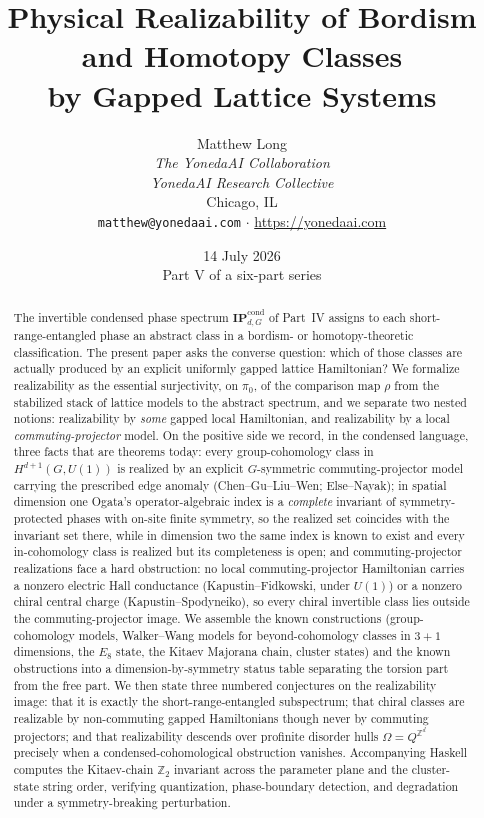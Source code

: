 \documentclass[12pt]{article}
\title{\bfseries Physical Realizability of Bordism and Homotopy Classes\\ by Gapped Lattice Systems}
\author{Matthew Long \\
\textit{The YonedaAI Collaboration} \\
\textit{YonedaAI Research Collective} \\
Chicago, IL \\
\texttt{matthew@yonedaai.com} $\cdot$ \url{https://yonedaai.com}}
\date{14 July 2026\\[4pt]\small Part V of a six-part series}
\newcommand{\IPcond}{\mathbf{IP}^{\mathrm{cond}}}  %
\newcommand{\dis}{\Omega}                       %
\newcommand{\real}{\rho}                         %
\newcommand{\Ztwo}{\mathbb{Z}_2}
\newcommand{\Zint}{\mathbb{Z}}
\theoremstyle{definition}
\theoremstyle{remark}
\begin{document}
\maketitle

\begin{abstract}
\noindent
The invertible condensed phase spectrum $\IPcond_{d,G}$ of Part~IV assigns to each
short-range-entangled phase an abstract class in a bordism- or homotopy-theoretic
classification. The present paper asks the converse question: which of those classes are
actually produced by an explicit uniformly gapped lattice Hamiltonian? We formalize
realizability as the essential surjectivity, on $\pi_0$, of the comparison map
$\real$ from the stabilized stack of lattice models to the abstract spectrum, and we
separate two nested notions: realizability by \emph{some} gapped local Hamiltonian, and
realizability by a local \emph{commuting-projector} model. On the positive side we record,
in the condensed language, three facts that are theorems today: every group-cohomology
class in $H^{d+1}(G,U(1))$ is realized by an explicit $G$-symmetric commuting-projector
model carrying the prescribed edge anomaly (Chen--Gu--Liu--Wen; Else--Nayak); in spatial
dimension one Ogata's operator-algebraic index is a \emph{complete} invariant of
symmetry-protected phases with on-site finite symmetry, so the realized set coincides with the
invariant set there, while in dimension two the same index is known to exist and every
in-cohomology class is realized but its completeness is open; and commuting-projector
realizations face a hard obstruction: no local commuting-projector Hamiltonian carries a
nonzero electric Hall conductance (Kapustin--Fidkowski, under $U(1)$) or a nonzero chiral
central charge (Kapustin--Spodyneiko), so every chiral invertible class lies outside the
commuting-projector image. We assemble the known
constructions (group-cohomology models, Walker--Wang models for beyond-cohomology classes
in $3+1$ dimensions, the $E_8$ state, the Kitaev Majorana chain, cluster states) and the
known obstructions into a dimension-by-symmetry status table separating the torsion part
from the free part. We then state three numbered conjectures on the realizability image:
that it is exactly the short-range-entangled subspectrum; that chiral classes are
realizable by non-commuting gapped Hamiltonians though never by commuting projectors; and
that realizability descends over profinite disorder hulls $\dis=Q^{\Zint^d}$ precisely when
a condensed-cohomological obstruction vanishes. Accompanying Haskell computes the
Kitaev-chain $\Ztwo$ invariant across the parameter plane and the cluster-state string
order, verifying quantization, phase-boundary detection, and degradation under a
symmetry-breaking perturbation.
\end{abstract}
\end{document}
